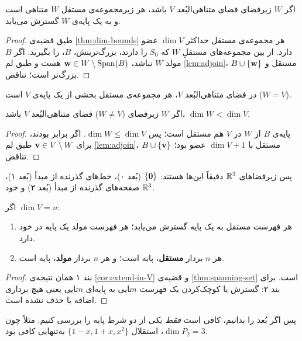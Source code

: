 \begin{theorem}\label{thm:extend-basis}
اگر $W$ زیرفضای فضای متناهی‌البُعد $V$ باشد، هر زیرمجموعه‌ی مستقل $W$ متناهی است و به یک پایه‌ی $W$ گسترش می‌یابد.
\end{theorem}
\begin{proof}
طبق قضیه‌ی \ref{thm:dim-bounds} هر مجموعه‌ی مستقل حداکثر $\dim V$ عضو دارد. از بین مجموعه‌های مستقلِ $W$ که $S_0$ را دارند، بزرگ‌ترینش، $B$، را بگیرید. اگر $B$ مولد $W$ نباشد، $\mathbf{w}\in W\setminus\operatorname{Span}(B)$ هست و طبق لم \ref{lem:adjoin}، $B\cup\{\mathbf{w}\}$ مستقل و بزرگ‌تر است؛ تناقض.
\end{proof}

\begin{corollary}\label{cor:extend-in-V}
در فضای متناهی‌البُعد $V$، هر مجموعه‌ی مستقل بخشی از یک پایه‌ی $V$ است ($W=V$).
\end{corollary}

\begin{corollary}\label{cor:proper-subspace}
اگر $W$ زیرفضای  ($W\neq V$) فضای متناهی‌البُعد $V$ باشد، $\dim W<\dim V$.
\end{corollary}
\begin{proof}
پایه‌ی $B$ از $W$ در $V$ هم مستقل است؛ پس $\dim W\le\dim V$. اگر برابر بودند، برای $\mathbf{v}\in V\setminus W$ طبق لم \ref{lem:adjoin}، $B\cup\{\mathbf{v}\}$ مستقل با $\dim V+1$ عضو بود؛ تناقض.
\end{proof}

پس زیرفضاهای $\mathbb{R}^3$ دقیقاً این‌ها هستند: $\{\mathbf{0}\}$ (بُعد ۰)، خط‌های گذرنده از مبدأ (بُعد ۱)، صفحه‌های گذرنده از مبدأ (بُعد ۲) و خود $\mathbb{R}^3$.

\begin{theorem}\label{thm:basis-props}
اگر $\dim V=n$:
\begin{enumerate}
  \item هر فهرست مستقل به یک پایه گسترش می‌یابد؛ هر فهرست مولد یک پایه در خود دارد.
  \item هر $n$ بردار \textbf{مستقل}، پایه است؛ و هر $n$ بردار \textbf{مولد}، پایه است.
\end{enumerate}
\end{theorem}
\begin{proof}
بند ۱ همان نتیجه‌ی \ref{cor:extend-in-V} و قضیه‌ی \ref{thm:spanning-set} است. برای بند ۲: گسترش یا کوچک‌کردن یک فهرست $n$تایی به پایه‌ای $n$تایی یعنی هیچ برداری اضافه یا حذف نشده است.
\end{proof}

\begin{note}
پس اگر بُعد را بدانیم، کافی است \emph{فقط یکی} از دو شرط پایه را بررسی کنیم. مثلاً چون $\dim P_2=3$، استقلال $\{1-x,1+x,x^2\}$ به‌تنهایی کافی بود.
\end{note}

